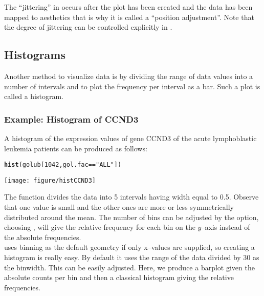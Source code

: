 \documentclass{article}\usepackage[]{graphicx}\usepackage[usenames,dvipsnames]{color}
\makeatletter
\def\maxwidth{ %
  \ifdim\Gin@nat@width>\linewidth
    \linewidth
  \else
    \Gin@nat@width
  \fi
}
\newcommand{\hlnum}[1]{\textcolor[rgb]{0.686,0.059,0.569}{#1}}%
\newcommand{\hlstr}[1]{\textcolor[rgb]{0.192,0.494,0.8}{#1}}%
\newcommand{\hlopt}[1]{\textcolor[rgb]{0,0,0}{#1}}%
\newcommand{\hlstd}[1]{\textcolor[rgb]{0.345,0.345,0.345}{#1}}%
\newcommand{\hlkwd}[1]{\textcolor[rgb]{0.737,0.353,0.396}{\textbf{#1}}}%
\newenvironment{kframe}{%
 \def\at@end@of@kframe{}%
 \ifinner\ifhmode%
  \def\at@end@of@kframe{\end{minipage}}%
  \begin{minipage}{\columnwidth}%
 \fi\fi%
 \def\FrameCommand##1{\hskip\@totalleftmargin \hskip-\fboxsep
 \colorbox{shadecolor}{##1}\hskip-\fboxsep
     \hskip-\linewidth \hskip-\@totalleftmargin \hskip\columnwidth}%
 \MakeFramed {\advance\hsize-\width
   \@totalleftmargin\z@ \linewidth\hsize
   \@setminipage}}%
 {\par\unskip\endMakeFramed%
 \at@end@of@kframe}
\newenvironment{knitrout}{}{} %
\makeatother
\begin{document}
The ``jittering'' in  occurs after the plot has been created
and the data has been mapped to aesthetics that is why it is called a ``position
adjustment''.  Note that the degree of jittering can be controlled 
explicitly in .


\subsection{Histograms}

Another method to visualize data is by dividing the range of data values into
a number of intervals and to plot the frequency per interval as a bar. Such
a plot is called a histogram.

\subsubsection*{Example: Histogram of CCND3}
A histogram of the expression values of gene CCND3 
of the acute lymphoblastic leukemia patients can be produced as follows:

\begin{knitrout}
\color{fgcolor}\begin{kframe}
\begin{alltt}
\hlkwd{hist}\hlstd{(golub[}\hlnum{1042}\hlstd{, gol.fac}\hlopt{==}\hlstr{"ALL"}\hlstd{])}
\end{alltt}
\end{kframe}
\texttt{[image: figure/histCCND3]} 

\end{knitrout}

The function  divides the data into 5 intervals having width equal to
0.5. Observe  that one value is small and the
other ones are more or less symmetrically distributed around the mean. The number
of bins can be adjusted by the  option, choosing
, will give the relative frequency for each bin on
the $y$--axis instead of the absolute frequencies. \\


 uses binning as the default geometry if only x--values are
supplied, so creating a histogram is really easy. By default it uses the range of
the data divided by 30 as the binwidth. This can be easily adjusted. Here, we
produce a barplot given the absolute counts per bin and then a classical histogram
giving the relative frequencies.
\end{document}
